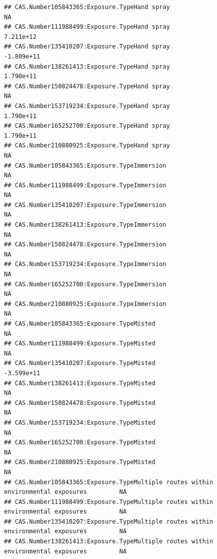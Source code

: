 \documentclass[
  12pt,
]{article}
\begin{document}
\begin{verbatim}
## CAS.Number105843365:Exposure.TypeHand spray                                             NA
## CAS.Number111988499:Exposure.TypeHand spray                                      7.211e+12
## CAS.Number135410207:Exposure.TypeHand spray                                     -1.809e+11
## CAS.Number138261413:Exposure.TypeHand spray                                      1.790e+11
## CAS.Number150824478:Exposure.TypeHand spray                                             NA
## CAS.Number153719234:Exposure.TypeHand spray                                      1.790e+11
## CAS.Number165252700:Exposure.TypeHand spray                                      1.790e+11
## CAS.Number210880925:Exposure.TypeHand spray                                             NA
## CAS.Number105843365:Exposure.TypeImmersion                                              NA
## CAS.Number111988499:Exposure.TypeImmersion                                              NA
## CAS.Number135410207:Exposure.TypeImmersion                                              NA
## CAS.Number138261413:Exposure.TypeImmersion                                              NA
## CAS.Number150824478:Exposure.TypeImmersion                                              NA
## CAS.Number153719234:Exposure.TypeImmersion                                              NA
## CAS.Number165252700:Exposure.TypeImmersion                                              NA
## CAS.Number210880925:Exposure.TypeImmersion                                              NA
## CAS.Number105843365:Exposure.TypeMisted                                                 NA
## CAS.Number111988499:Exposure.TypeMisted                                                 NA
## CAS.Number135410207:Exposure.TypeMisted                                         -3.599e+11
## CAS.Number138261413:Exposure.TypeMisted                                                 NA
## CAS.Number150824478:Exposure.TypeMisted                                                 NA
## CAS.Number153719234:Exposure.TypeMisted                                                 NA
## CAS.Number165252700:Exposure.TypeMisted                                                 NA
## CAS.Number210880925:Exposure.TypeMisted                                                 NA
## CAS.Number105843365:Exposure.TypeMultiple routes within environmental exposures         NA
## CAS.Number111988499:Exposure.TypeMultiple routes within environmental exposures         NA
## CAS.Number135410207:Exposure.TypeMultiple routes within environmental exposures         NA
## CAS.Number138261413:Exposure.TypeMultiple routes within environmental exposures         NA

\end{verbatim}
\end{document}
